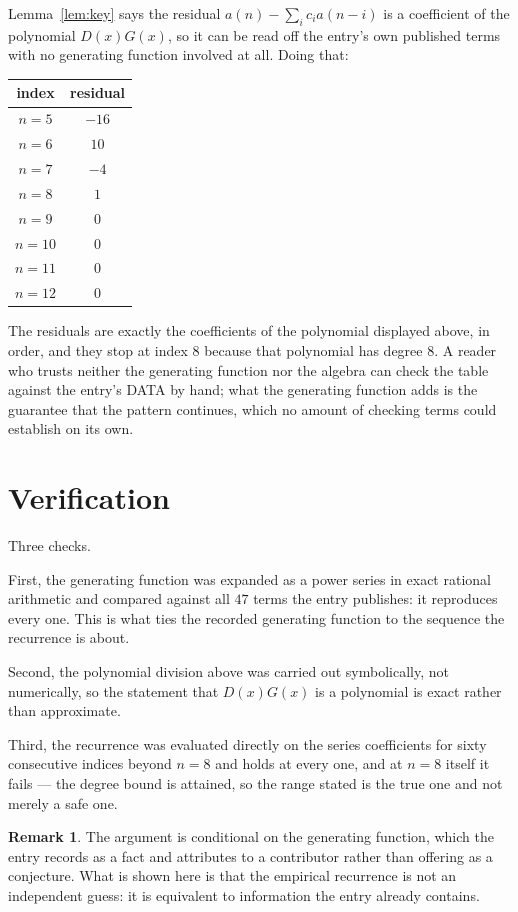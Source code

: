 \documentclass[11pt,a4paper]{article}
\theoremstyle{plain}
\theoremstyle{definition}
\newtheorem{remark}[theorem]{Remark}
\begin{document}
Lemma~\ref{lem:key} says the residual $a(n)-\sum_ic_ia(n-i)$ is a coefficient of the
polynomial $D(x)G(x)$, so it can be read off the entry's own published terms with no
generating function involved at all. Doing that:
\begin{center}
\begin{tabular}{cc}
index & residual \\ \hline
$n=5$ & $-16$ \\
$n=6$ & $10$ \\
$n=7$ & $-4$ \\
$n=8$ & $1$ \\
$n=9$ & $0$ \\
$n=10$ & $0$ \\
$n=11$ & $0$ \\
$n=12$ & $0$
\end{tabular}
\end{center}
The residuals are exactly the coefficients of the polynomial displayed above, in order, and
they stop at index $8$ because that polynomial has degree $8$. A reader who trusts
neither the generating function nor the algebra can check the table against the entry's DATA
by hand; what the generating function adds is the guarantee that the pattern continues, which
no amount of checking terms could establish on its own.

\section{Verification}

Three checks.

First, the generating function was expanded as a power series in exact rational arithmetic and
compared against all $47$ terms the entry publishes: it reproduces every one. This is
what ties the recorded generating function to the sequence the recurrence is about.

Second, the polynomial division above was carried out symbolically, not numerically, so the
statement that $D(x)G(x)$ is a polynomial is exact rather than approximate.

Third, the recurrence was evaluated directly on the series coefficients for sixty consecutive
indices beyond $n=8$ and holds at every one, and at $n=8$ itself it fails --- the
degree bound is attained, so the range stated is the true one and not merely a safe one.

\begin{remark}
The argument is conditional on the generating function, which the entry records as a fact and
attributes to a contributor rather than offering as a conjecture. What is shown here is that
the empirical recurrence is not an independent guess: it is equivalent to information the
entry already contains.
\end{remark}
\end{document}
